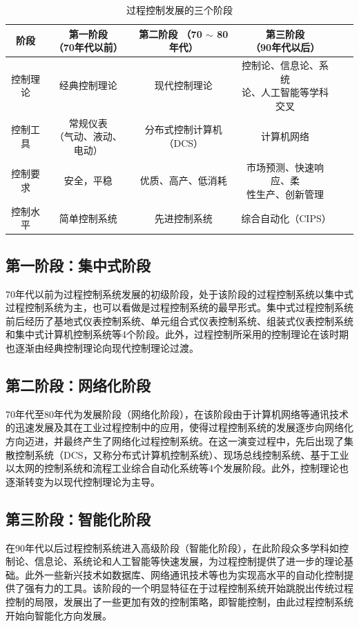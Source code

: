 \documentclass{my_class}
\begin{document}
\begin{table}[H] %
\centering %
\begin{tabular}{cccccc} %
	\toprule %
	阶段 & \makecell{第一阶段\\（70年代以前）} & \makecell{第二阶段\\（70 $\sim$ 80年代）} & \makecell{第三阶段\\（90年代以后）} \\
	\midrule %
	控制理论 & 经典控制理论 & 现代控制理论 & \makecell{控制论、信息论、系统\\论、人工智能等学科交叉} \\
	控制工具 & \makecell{常规仪表\\（气动、液动、电动）} & 分布式控制计算机（DCS） & 计算机网络 \\
	控制要求 & 安全，平稳 & 优质、高产、低消耗 & \makecell{市场预测、快速响应、柔\\性生产、创新管理} \\
	控制水平 & 简单控制系统 & 先进控制系统 & 综合自动化（CIPS） \\
	\bottomrule %
\end{tabular}
\caption{过程控制发展的三个阶段} %
\end{table}

\subsection{第一阶段：集中式阶段}
70年代以前为过程控制系统发展的初级阶段，处于该阶段的过程控制系统以集中式过程控制系统为主，也可以看做是过程控制系统的最早形式。集中式过程控制系统前后经历了基地式仪表控制系统、单元组合式仪表控制系统、组装式仪表控制系统和集中式计算机控制系统等4个阶段。此外，过程控制所采用的控制理论在该时期也逐渐由经典控制理论向现代控制理论过渡。


\subsection{第二阶段：网络化阶段}
70年代至80年代为发展阶段（网络化阶段），在该阶段由于计算机网络等通讯技术的迅速发展及其在工业过程控制中的应用，使得过程控制系统的发展逐步向网络化方向迈进，并最终产生了网络化过程控制系统。在这一演变过程中，先后出现了集散控制系统（DCS，又称分布式计算机控制系统）、现场总线控制系统、基于工业以太网的控制系统和流程工业综合自动化系统等4个发展阶段。此外，控制理论也逐渐转变为以现代控制理论为主导。

\subsection{第三阶段：智能化阶段}
在90年代以后过程控制系统进入高级阶段（智能化阶段），在此阶段众多学科如控制论、信息论、系统论和人工智能等快速发展，为过程控制提供了进一步的理论基础。此外一些新兴技术如数据库、网络通讯技术等也为实现高水平的自动化控制提供了强有力的工具。该阶段的一个明显特征在于过程控制系统开始跳脱出传统过程控制的局限，发展出了一些更加有效的控制策略，即智能控制，由此过程控制系统开始向智能化方向发展。
\end{document}
